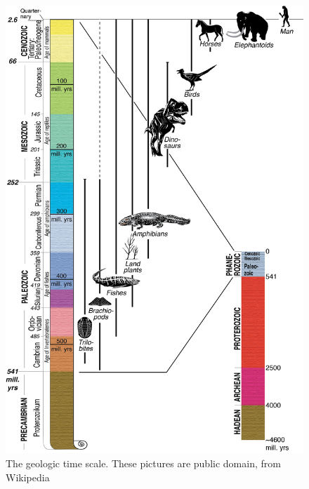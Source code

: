 \documentclass[a4paper,12pt]{report}
\begin{document}
\begin{figure}
 \includegraphics[width=\linewidth]{thesis/geo/english/time.jpg}
 \caption{The geologic time scale. These pictures are public domain, from Wikipedia}
 \label{fig:geoTime}
\end{figure}
\end{document}
